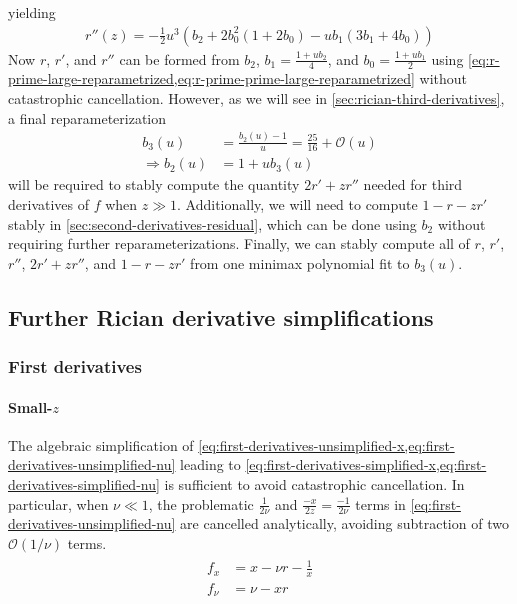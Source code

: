 \documentclass{article}
\begin{document}
%
yielding
%
\begin{align}\label{eq:r-prime-prime-large-reparametrized}
  \boxed{r''(z) = -\frac{1}{2} u^3 (b_2 + 2 b_0^2 (1 + 2 b_0) - u b_1 (3 b_1 + 4 b_0))}
\end{align}
%
Now $r$, $r'$, and $r''$ can be formed from $b_2$, $b_1 = \frac{1 + u b_2}{4}$, and $b_0 = \frac{1 + u b_1}{2}$ using \cref{eq:r-prime-large-reparametrized,eq:r-prime-prime-large-reparametrized} without catastrophic cancellation.
However, as we will see in \cref{sec:rician-third-derivatives}, a final reparameterization
%
\begin{align}
  b_3(u)             & = \frac{b_2(u)-1}{u} = \frac{25}{16} + \mathcal{O}(u) \\
  \Rightarrow b_2(u) & = 1 + u b_3(u)
\end{align}
%
will be required to stably compute the quantity $2r'+zr''$ needed for third derivatives of $f$ when $z \gg 1$.
Additionally, we will need to compute $1-r-zr'$ stably in \cref{sec:second-derivatives-residual}, which can be done using $b_2$ without requiring further reparameterizations.
Finally, we can stably compute all of $r$, $r'$, $r''$, $2r'+zr''$, and $1-r-zr'$ from one minimax polynomial fit to $b_3(u)$.


\subsection{Further Rician derivative simplifications}\label{sec:further-rician-derivative-simplifications}

\subsubsection{First derivatives}\label{sec:rician-first-derivatives}

\paragraph{Small-$z$}

The algebraic simplification of \cref{eq:first-derivatives-unsimplified-x,eq:first-derivatives-unsimplified-nu} leading to \cref{eq:first-derivatives-simplified-x,eq:first-derivatives-simplified-nu} is sufficient to avoid catastrophic cancellation.
In particular, when $\nu \ll 1$, the problematic $\frac{1}{2\nu}$ and $\frac{-x}{2z} = \frac{-1}{2\nu}$ terms in \cref{eq:first-derivatives-unsimplified-nu} are cancelled analytically, avoiding subtraction of two $\mathcal{O}(1/\nu)$ terms.
%
\begin{align}\label{eq:first-derivatives-small-z}
  \boxed{
    \begin{aligned}
      f_x   & = x - \nu r - \frac{1}{x} \\
      f_\nu & = \nu - x r
    \end{aligned}
  }
\end{align}
\end{document}
